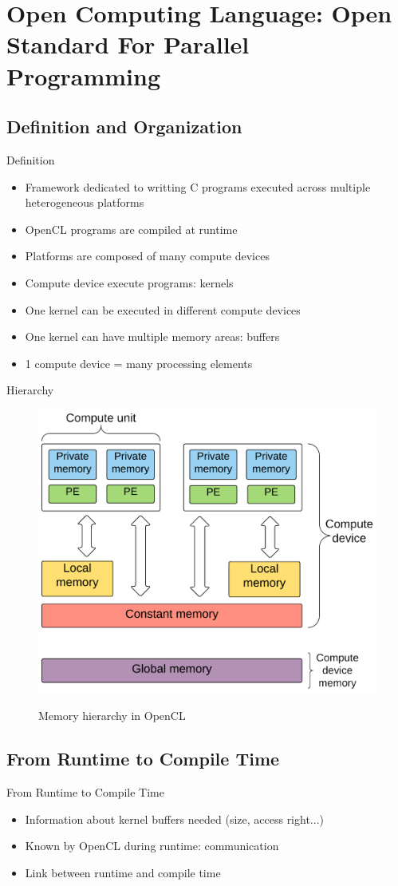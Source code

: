 \documentclass{beamer}
\begin{document}
\section{Open Computing Language: Open Standard For Parallel Programming}
\subsection{Definition and Organization}
\begin{frame}{Definition}
\begin{itemize}
\item Framework dedicated to writting C programs executed across multiple heterogeneous platforms
\item OpenCL programs are compiled at runtime
\item Platforms are composed of many compute devices
\item Compute device execute programs: kernels
\item One kernel can be executed in different compute devices
\item One kernel can have multiple memory areas: buffers
\item 1 compute device = many processing elements
\end{itemize}
\end{frame}

\begin{frame}{Hierarchy}
\begin{figure}[ht]
         \center
            \includegraphics[width=0.55\linewidth]{mem.png}
         \label{Pass}
         \caption{Memory hierarchy in OpenCL}
        \end{figure}
\end{frame}

\subsection{From Runtime to Compile Time}
\begin{frame}{From Runtime to Compile Time}
\begin{itemize}
\item Information about kernel buffers needed (size, access right...) 
\item Known by OpenCL during runtime: communication
\item Link between runtime and compile time
\end{itemize}
\end{frame}
\end{document}
